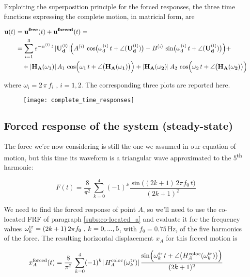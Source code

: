 \documentclass[a4paper,12pt,oneside]{article}
\begin{document}
Exploiting the superposition principle for the forced responses, the three time functions expressing the complete motion, in matricial form, are

\[ \begin{split}
	\mathbf{u}(t) & = \mathbf{u^{free}}(t) + \mathbf{u^{forced}}(t) = \\
								& = \sum_{i=1}^3 e^{-\alpha^{(i)} \, t} \, |\mathbf{U_d^{(i)}}|
									\Bigl(A^{(i)} \,
									\cos\bigl(\omega_\textup{d}^{(i)} \, t +
									\angle(\mathbf{U_d^{(i)}})\bigr) +
									B^{(i)} \,
									\sin\bigl(\omega_\textup{d}^{(i)} \, t +
									\angle(\mathbf{U_d^{(i)}})\bigr)\Bigr) + \\
								& ~~~ + |\mathbf{H_A(\omega_1)}| \, A_1 \, \cos\Bigl(\omega_1 \, t +
									\angle\bigl(\mathbf{H_A(\omega_1)}\bigr)\Bigr) +
									|\mathbf{H_A(\omega_2)}| \, A_2 \, \cos\Bigl(\omega_2 \, t +
									\angle\bigl(\mathbf{H_A(\omega_2)}\bigr)\Bigr)
\end{split} \]

where $ \omega_i = 2 \, \pi \, f_i \text{ , } i = 1,2 $. The corresponding three plots are reported here.

\begin{figure}[h]
	\hspace{-70pt}
	\texttt{[image: complete\_time\_responses]}
\end{figure}

\subsection{Forced response of the system (steady-state)}

The force we're now considering is still the one we assumed in our equation of motion, but this time its waveform is a triangular wave approximated to the 5\textsuperscript{th} harmonic:

\[
	F(t) = \frac{8}{\pi^2} \, \sum_{k=0}^4 (-1)^k
		\frac{\sin\bigl((2k + 1) \, 2 \pi f_0 \, t\bigr)}{(2k + 1)^2}
\]

We need to find the forced response of point $ A $, so we'll need to use the co-located FRF of paragraph \ref{subs:co-located_a} and evaluate it for the frequency values $ \omega^\textup{tr}_k = (2k + 1) \, 2 \pi f_0 \text{ , } k = 0,...,5 $, with $ f_0 = 0.75 \, \text{Hz} $, of the five harmonics of the force. The resulting horizontal displacement $ x_A $ for this forced motion is

\[
	x_A^\textup{forced}(t) = \frac{8}{\pi^2} \, \sum_{k=0}^4 (-1)^k \,
		|H^\textup{coloc}_A(\omega^\textup{tr}_k)| \,
		\frac{\sin\Bigl(\omega^\textup{tr}_k \, t +
		\angle\bigl(H^\textup{coloc}_A(\omega^\textup{tr}_k)\bigr)\Bigr)}{(2k + 1)^2}
\]
\end{document}

